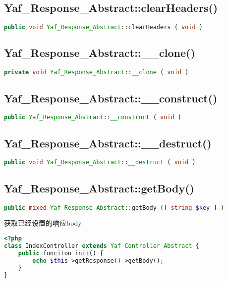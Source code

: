 \subsection{Yaf\_Response\_Abstract::clearHeaders()}



\begin{lstlisting}[language=PHP]
public void Yaf_Response_Abstract::clearHeaders ( void )
\end{lstlisting}



\subsection{Yaf\_Response\_Abstract::\_\_clone()}


\begin{lstlisting}[language=PHP]
private void Yaf_Response_Abstract::__clone ( void )
\end{lstlisting}


\subsection{Yaf\_Response\_Abstract::\_\_construct()}


\begin{lstlisting}[language=PHP]
public Yaf_Response_Abstract::__construct ( void )
\end{lstlisting}

\subsection{Yaf\_Response\_Abstract::\_\_destruct()}


\begin{lstlisting}[language=PHP]
public void Yaf_Response_Abstract::__destruct ( void )
\end{lstlisting}

\subsection{Yaf\_Response\_Abstract::getBody()}

\begin{lstlisting}[language=PHP]
public mixed Yaf_Response_Abstract::getBody ([ string $key ] )
\end{lstlisting}

获取已经设置的响应body


\begin{lstlisting}[language=PHP]
<?php
class IndexController extends Yaf_Controller_Abstract {
    public funciton init() {
        echo $this->getResponse()->getBody();
    }
}
\end{lstlisting}

